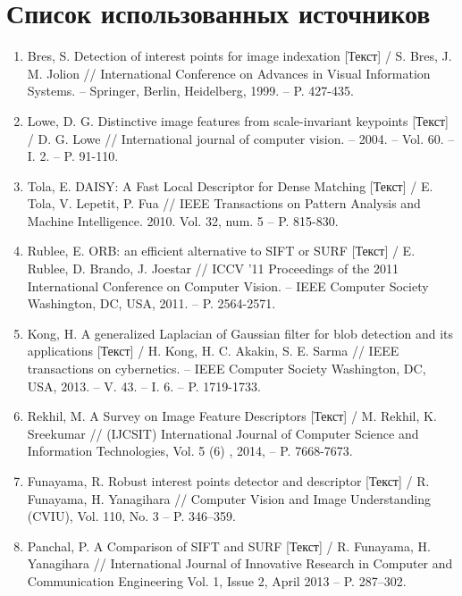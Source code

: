 {{{{\section*{Список использованных источников}
{
	\begin{enumerate}[label=\arabic*]
	\item{Bres, S. Detection of interest points for image indexation [Текст] / S. Bres, J. M. Jolion // International Conference on Advances in Visual Information Systems. -- Springer, Berlin, Heidelberg, 1999. -- P. 427-435.}{\label{interest points}}	
	\item{Lowe, D. G. Distinctive image features from scale-invariant keypoints [Текст] / D. G. Lowe // International journal of computer vision. -- 2004. -- Vol. 60. -- I. 2. -- P. 91-110.}\label{lowe surf}
	\item{Tola, E. DAISY: A Fast Local Descriptor for Dense Matching [Текст] / E. Tola, V. Lepetit, P. Fua // IEEE Transactions on Pattern Analysis and Machine Intelligence. 2010. Vol. 32, num. 5  -- P. 815-830.}{\label{tola_paper}}	
	\item{Rublee, E. ORB: an efficient alternative to SIFT or SURF [Текст] / E. Rublee, D. Brando, J. Joestar // ICCV '11 Proceedings of the 2011 International Conference on Computer Vision. -- IEEE Computer Society Washington, DC, USA, 2011. -- P. 2564-2571. }\label{rublee orb}
	\item{Kong, H. A generalized Laplacian of Gaussian filter for blob detection and its applications [Текст] / H. Kong, H. C. Akakin, S. E. Sarma // IEEE transactions on cybernetics. -- IEEE Computer Society Washington, DC, USA, 2013. -- V. 43. -- I. 6. -- P. 1719-1733.}{\label{imagematching paper}}
	\item{Rekhil, M. A Survey on Image Feature Descriptors [Текст] / M. Rekhil, K. Sreekumar //  (IJCSIT) International Journal of Computer Science and Information Technologies, Vol. 5 (6) , 2014, -- P. 7668-7673.}{\label{surveyon}}
	\item{Funayama, R. Robust interest points detector and descriptor [Текст] / R. Funayama, H. Yanagihara //  Computer Vision and Image Understanding (CVIU), Vol. 110, No. 3 -- P. 346–359.}{\label{robust}}
	\item{Panchal, P. A Comparison of SIFT and SURF [Текст] / R. Funayama, H. Yanagihara //  International Journal of Innovative Research in Computer and Communication Engineering Vol. 1, Issue 2, April 2013 -- P. 287–302.}{\label{comparison}}


\end{enumerate}}}}}}
